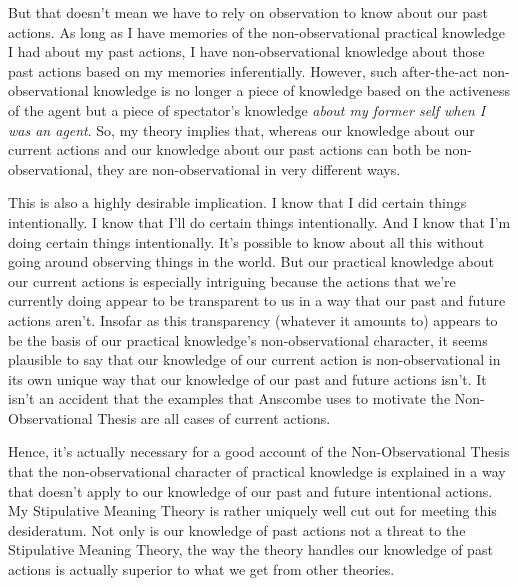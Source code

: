 \documentclass[a4paper,12pt]{article}
\begin{document}
But that doesn't mean we have to rely on observation to know about our past actions. As long as I have memories of the non-observational practical knowledge I had about my past actions, I have non-observational knowledge about those past actions based on my memories inferentially. However, such after-the-act non-observational knowledge is no longer a piece of knowledge based on the activeness of the agent but a piece of spectator's knowledge \emph{about my former self when I was an agent}. So, my theory implies that, whereas our knowledge about our current actions and our knowledge about our past actions can both be non-observational, they are non-observational in very different ways.

This is also a highly desirable implication. I know that I did certain things intentionally. I know that I'll do certain things intentionally. And I know that I'm doing certain things intentionally. It's possible to know about all this without going around observing things in the world. But our practical knowledge about our current actions is especially intriguing because the actions that we're currently doing appear to be transparent to us in a way that our past and future actions aren't. Insofar as this transparency (whatever it amounts to) appears to be the basis of our practical knowledge's non-observational character, it seems plausible to say that our knowledge of our current action is non-observational in its own unique way that our knowledge of our past and future actions isn't. It isn't an accident that the examples that Anscombe uses to motivate the Non-Observational Thesis are all cases of current actions.

Hence, it's actually necessary for a good account of the Non-Observational Thesis that the non-observational character of practical knowledge is explained in a way that doesn't apply to our knowledge of our past and future intentional actions. My Stipulative Meaning Theory is rather uniquely well cut out for meeting this desideratum. Not only is our knowledge of past actions not a threat to the Stipulative Meaning Theory, the way the theory handles our knowledge of past actions is actually superior to what we get from other theories.
\end{document}
